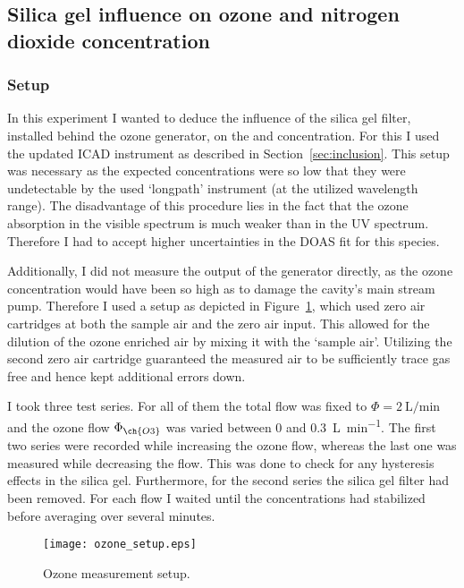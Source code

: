 \subsection{Silica gel influence on ozone and nitrogen dioxide concentration}
\label{sec:silica}

\subsubsection{Setup}
\label{sec:silica-setup}

In this experiment I wanted to deduce the influence of the silica gel
filter, installed behind the ozone generator, on the  and
 concentration. For this I used the updated ICAD instrument as
described in Section~\ref{sec:inclusion}. This setup was necessary as
the expected  concentrations were so low that they were
undetectable by the used `longpath' instrument (at the utilized
wavelength range). The disadvantage of this procedure lies in the fact
that the ozone absorption in the visible spectrum is much weaker than
in the UV spectrum. Therefore I had to accept higher uncertainties in
the DOAS fit for this species.

Additionally, I did not measure the output of the generator directly,
as the ozone concentration would have been so high as to damage the
cavity's main stream pump. Therefore I used a setup as depicted in
Figure~\ref{fig:ozone-flow-setup}, which used zero air cartridges at
both the sample air and the zero air input. This allowed for the
dilution of the ozone enriched air by mixing it with the `sample
air'. Utilizing the second zero air cartridge guaranteed the
measured air to be sufficiently trace gas free and hence kept
additional errors down.

I took three test series. For all of them the total flow was fixed to
$\Phi = \SI{2}{\liter\per\minute}$ and the ozone flow $\Phi_{\ch{O3}}$
was varied between \num{0} and \SI{0.3}{\liter\per\minute}. The first
two series were recorded while increasing the ozone flow, whereas the
last one was measured while decreasing the flow. This was done to
check for any hysteresis effects in the silica gel. Furthermore, for
the second series the silica gel filter had been removed. For each
flow I waited until the concentrations had stabilized before averaging
over several minutes.

\begin{figure}[htbp]
  \centering
  \texttt{[image: ozone\_setup.eps]}
  \caption{Ozone measurement setup.}
  \label{fig:ozone-flow-setup}
\end{figure}

